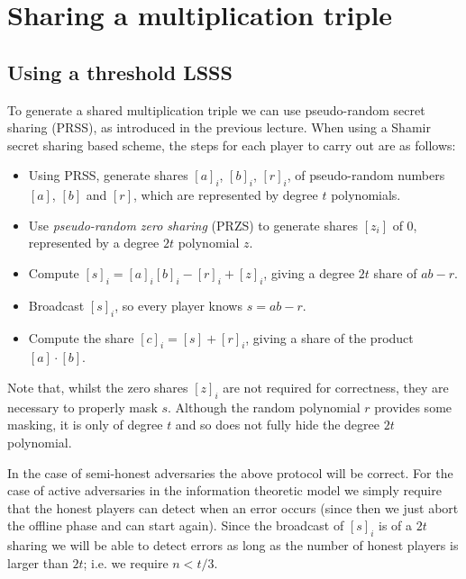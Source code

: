 \documentclass[11pt]{article}
\begin{document}
\section*{Sharing a multiplication triple}

\subsection*{Using a threshold LSSS}

To generate a shared multiplication triple we can use pseudo-random secret
sharing (PRSS), as introduced in the previous lecture.
When using a Shamir secret sharing based scheme, the steps for each 
player to carry out are as follows:

\begin{itemize}
\item Using PRSS, generate shares $[a]_i$, $[b]_i$, $[r]_i$, of pseudo-random
numbers $[a]$, $[b]$ and $[r]$, which are represented by degree $t$ polynomials.

\item Use \textit{pseudo-random zero sharing} (PRZS) to generate shares $[z_i]$ of $0$,
represented by a degree $2t$ polynomial $z$.

\item Compute $[s]_i = [a]_i [b]_i - [r]_i + [z]_i$, giving a degree $2t$ share
of $ab - r$.

\item Broadcast $[s]_i$, so every player knows $s = ab - r$.

\item Compute the share $[c]_i = [s] + [r]_i$, giving a share of the product $[a]\cdot [b]$.

\end{itemize}

Note that, whilst the zero shares $[z]_i$ are not required for correctness, they
are necessary to properly mask $s$. Although the random polynomial $r$ provides
some masking, it is only of degree $t$ and so does not fully hide the degree
$2t$ polynomial.

In the case of semi-honest adversaries the above protocol will be correct.
For the case of active adversaries in the information theoretic model
we simply require that the honest players can detect when an error
occurs (since then we just abort the offline phase and can start again).
Since the broadcast of $[s]_i$ is of a $2t$ sharing we will be able
to detect errors as long as the number of honest players is larger
than $2t$; i.e. we require $n<t/3$.
\end{document}

